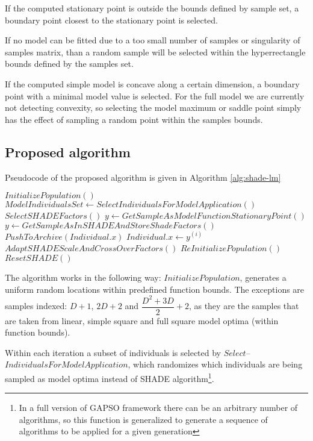 \documentclass[manuscript]{acmart}
\begin{document}
If the computed stationary point is outside the bounds defined by sample set,
a boundary point closest to the stationary point is selected.

If no model can be fitted due to a too small number of samples or singularity of samples matrix,
than a random sample will be selected within the hyperrectangle bounds defined by the samples set.

If the computed simple model is concave along a certain dimension, a boundary point with a minimal model value is selected. For the full model we are currently not detecting convexity, so selecting the model maximum or saddle point simply
has the effect of sampling a random point within the samples bounds.

\subsection{Proposed algorithm}

Pseudocode of the proposed algorithm is given in Algorithm \ref{alg:shade-lm}

\begin{algorithm}[H]
	\begin{algorithmic}[1]
	\footnotesize
	\State $InitializePopulation()$
		\State $ModelIndividualsSet \gets SelectIndividualsForModelApplication()$
		\State $SelectSHADEFactors()$
				\State $y \gets GetSampleAsModelFunctionStationaryPoint()$
			\Else
				\State $y \gets GetSampleAsInSHADEAndStoreShadeFactors()$
			\EndIf
				\State $PushToArchive(Individual.x)$
				\State $Individual.x \gets y^{(i)}$
			\EndIf
		\EndFor
		\State $AdaptSHADEScaleAndCrossOverFactors()$
			\State $ReInitializePopulation()$
			\State $ResetSHADE()$
		\EndIf
	\EndWhile
	\caption{SHADE-LM pseudocode%
	\label{alg:shade-lm}}
	\end{algorithmic}
	\end{algorithm}
  
The algorithm works in the following way: $InitializePopulation$,
generates a uniform random locations within predefined function bounds. The exceptions are samples indexed: $D + 1$, $2D + 2$ and $\dfrac{D^2+ 3D}{2} + 2$, as they are the samples that are taken from linear, simple square
and full square model optima (within function bounds).

Within each iteration a subset of individuals is selected
by $Select$--$IndividualsForModelApplication$, which randomizes which
individuals are being sampled as model optima instead of SHADE algorithm\footnote{In a full version of GAPSO framework there can be an
arbitrary number of algorithms, so this function is generalized
to generate a sequence of algorithms to be applied for a given generation}.
\end{document}
